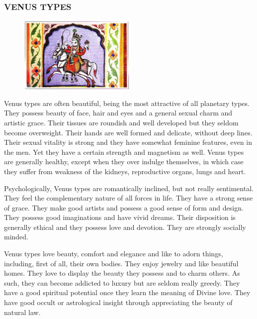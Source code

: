  



\subsubsection{VENUS TYPES}


 \begin{figure}[H]
 \centering
\includegraphics[width=0.5\textwidth]{pics/Venus_type.png}
 \end{figure}
 
 

Venus types are often beautiful, being the most attractive of all planetary types. They possess beauty of face, hair and eyes and a general sexual charm and artistic grace. Their tissues are roundish and well developed but they seldom become overweight. Their hands are well formed and delicate, without deep lines. Their sexual vitality is strong and they have somewhat feminine features, even in the men. Yet they have a certain strength and magnetism as well. Venus types are generally healthy, except when they over indulge themselves, in which case they suffer from weakness of the kidneys, reproductive organs, lungs and heart.

 

Psychologically, Venus types are romantically inclined, but not really sentimental. They feel the complementary nature of all forces in life. They have a strong sense of grace. They make good artists and possess a good sense of form and design. They possess good imaginations and have vivid dreams. Their disposition is generally ethical and they possess love and devotion. They are strongly socially minded.

 

Venus types love beauty, comfort and elegance and like to adorn things, including, first of all, their own bodies. They enjoy jewelry and like beautiful homes. They love to display the beauty they possess and to charm others. As such, they can become addicted to luxury but are seldom really greedy. They have a good spiritual potential once they learn the meaning of Divine love. They have good occult or astrological insight through appreciating the beauty of natural law.

